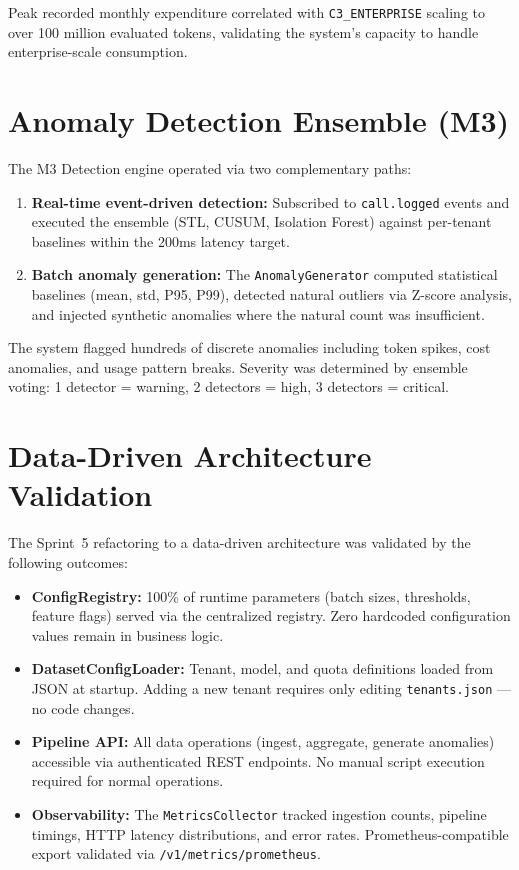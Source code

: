 \documentclass[12pt,a4paper,twoside]{report}
\begin{document}
Peak recorded monthly expenditure correlated with \texttt{C3\_ENTERPRISE} scaling to over 100 million evaluated tokens, validating the system's capacity to handle enterprise-scale consumption.

\section{Anomaly Detection Ensemble (M3)}

The M3 Detection engine operated via two complementary paths:
\begin{enumerate}
  \item \textbf{Real-time event-driven detection:} Subscribed to \texttt{call.logged} events and executed the ensemble (STL, CUSUM, Isolation Forest) against per-tenant baselines within the 200ms latency target.
  \item \textbf{Batch anomaly generation:} The \texttt{AnomalyGenerator} computed statistical baselines (mean, std, P95, P99), detected natural outliers via Z-score analysis, and injected synthetic anomalies where the natural count was insufficient.
\end{enumerate}

The system flagged hundreds of discrete anomalies including token spikes, cost anomalies, and usage pattern breaks. Severity was determined by ensemble voting: 1 detector = warning, 2 detectors = high, 3 detectors = critical.

\section{Data-Driven Architecture Validation}

The Sprint~5 refactoring to a data-driven architecture was validated by the following outcomes:
\begin{itemize}
  \item \textbf{ConfigRegistry:} 100\% of runtime parameters (batch sizes, thresholds, feature flags) served via the centralized registry. Zero hardcoded configuration values remain in business logic.
  \item \textbf{DatasetConfigLoader:} Tenant, model, and quota definitions loaded from JSON at startup. Adding a new tenant requires only editing \texttt{tenants.json} --- no code changes.
  \item \textbf{Pipeline API:} All data operations (ingest, aggregate, generate anomalies) accessible via authenticated REST endpoints. No manual script execution required for normal operations.
  \item \textbf{Observability:} The \texttt{MetricsCollector} tracked ingestion counts, pipeline timings, HTTP latency distributions, and error rates. Prometheus-compatible export validated via \texttt{/v1/metrics/prometheus}.
\end{itemize}
\end{document}
